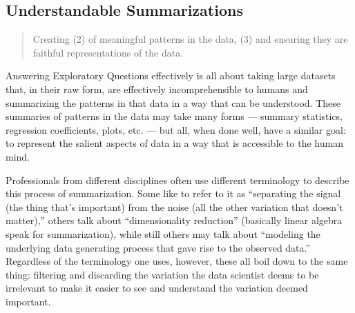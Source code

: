 \documentclass[letterpaper,10pt,english]{jupyterBook}
\begin{document}
\subsection{Understandable Summarizations}
\label{\detokenize{30_questions/15_answering_exploratory_questions:understandable-summarizations}}\begin{quote}

\sphinxAtStartPar
Creating  (2) of meaningful patterns in the data, (3) and ensuring they are faithful representations of the data.
\end{quote}

\sphinxAtStartPar
Answering Exploratory Questions effectively is all about taking large datasets that, in their raw form, are effectively incomprehensible to humans and summarizing the patterns in that data in a way that can be understood. These summaries of patterns in the data may take many forms — summary statistics, regression coefficients, plots, etc. — but all, when done well, have a similar goal: to represent the salient aspects of data in a way that is accessible to the human mind.

\sphinxAtStartPar
Professionals from different disciplines often use different terminology to describe this process of summarization. Some like to refer to it as “separating the signal (the thing that’s important) from the noise (all the other variation that doesn’t matter),” others talk about “dimensionality reduction” (basically linear algebra speak for summarization), while still others may talk about “modeling the underlying data generating process that gave rise to the observed data.” Regardless of the terminology one uses, however, these all boil down to the same thing: filtering and discarding the variation the data scientist deems to be irrelevant to make it easier to see and understand the variation deemed important.
\end{document}
